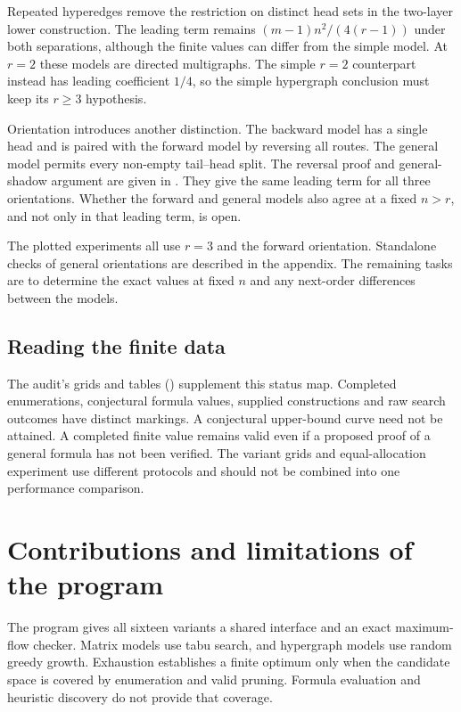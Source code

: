 Repeated hyperedges remove the restriction on distinct head sets in the
two-layer lower construction. The leading term remains
$(m-1)n^2/(4(r-1))$ under both separations, although the finite values can
differ from the simple model. At $r=2$ these models are directed
multigraphs. The simple $r=2$ counterpart instead has leading coefficient
$1/4$, so the simple hypergraph conclusion must keep its $r\ge3$ hypothesis.

Orientation introduces another distinction. The backward model has a single
head and is paired with the forward model by reversing all routes. The
general model permits every non-empty tail--head split. The
reversal proof and general-shadow argument are given in
. They give the
same leading term for all three orientations. Whether the forward and general
models also agree at a fixed $n>r$, and not only in that leading term, is open.

The plotted experiments all use $r=3$ and the forward orientation.
Standalone checks of general orientations are described in the appendix.
The remaining tasks are to determine the exact values at fixed $n$ and any
next-order differences between the models.

\subsection{Reading the finite data}

The audit's grids and tables () supplement this status
map. Completed enumerations, conjectural formula values, supplied
constructions and raw search outcomes have distinct markings. A conjectural
upper-bound curve need not be attained. A completed finite value remains
valid even if a proposed proof of a general formula has not been verified.
The variant grids and equal-allocation experiment use different protocols
and should not be combined into one performance comparison.

\section{Contributions and limitations of the program}

The program gives all sixteen variants a shared interface and an exact
maximum-flow checker. Matrix models use tabu search, and hypergraph models
use random greedy growth. Exhaustion establishes a finite optimum only when
the candidate space is covered by enumeration and valid pruning. Formula
evaluation and heuristic discovery do not provide that coverage.

